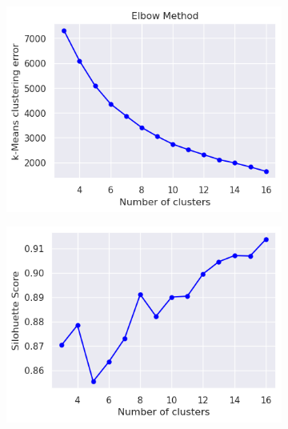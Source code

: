         \begin{figure}[H]
            \centering
            \begin{subfigure}[c]{0.47\textwidth}
                \centering
                \includegraphics[width=\textwidth]{../figures/plots/section3/k-means_clustering_error.png}
                \caption{}
                \label{fig:tsne_kmeans}
            \end{subfigure}
            \hfill
            \begin{subfigure}[c]{0.47\textwidth}
                \centering
                \includegraphics[width=\textwidth]{../figures/plots/section3/k-means_silohuette_score.png}
                \caption{}
                \label{fig:tsne_gmm}
            \end{subfigure}
            \vspace{-0.1cm}
            \caption{}
            \label{fig:}
        \end{figure}
        
